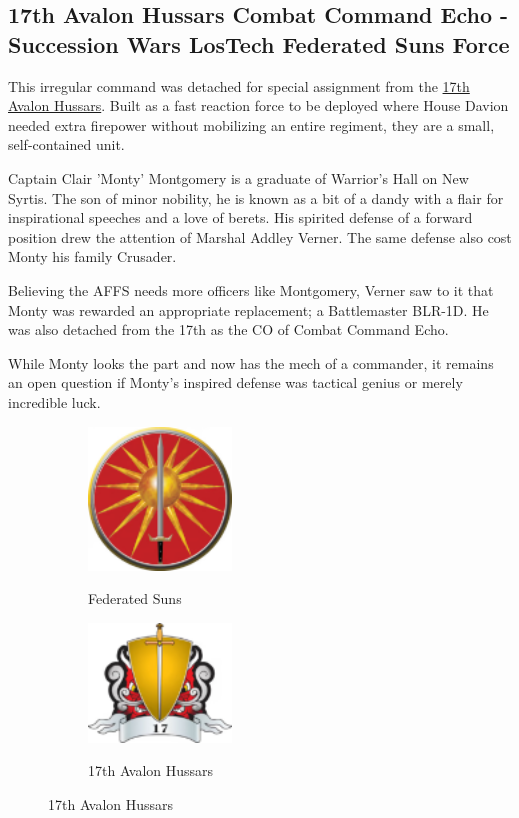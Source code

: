 \subsection{17th Avalon Hussars Combat Command Echo - Succession Wars LosTech Federated Suns Force}

This irregular command was detached for special assignment from the \href{https://www.sarna.net/wiki/17th_Avalon_Hussars}{17th Avalon Hussars}.
Built as a fast reaction force to be deployed where House Davion needed extra firepower without mobilizing an entire regiment, they are a small, self-contained unit.

Captain Clair 'Monty' Montgomery is a graduate of Warrior's Hall on New Syrtis.
The son of minor nobility, he is known as a bit of a dandy with a flair for inspirational speeches and a love of berets.
His spirited defense of a forward position drew the attention of Marshal Addley Verner.
The same defense also cost Monty his family Crusader.

Believing the AFFS needs more officers like Montgomery, Verner saw to it that Monty was rewarded an appropriate replacement; a Battlemaster BLR-1D.
He was also detached from the 17th as the CO of Combat Command Echo. 
 
While Monty looks the part and now has the mech of a commander, it remains an open question if Monty’s inspired defense was tactical genius or merely incredible luck.

\begin{figure}[!h]
  \begin{center}
  \begin{subfigure}{0.4\textwidth}
  \centering
  \includegraphics[alt='Federated Suns Logo', width=1.5in, height=1.5in]{img/Federated-Suns.png}
  \caption*{Federated Suns}
  \end{subfigure}
  \hspace{1in}
  \begin{subfigure}{0.4\textwidth}
  \centering
  \includegraphics[alt='17th Avalon Hussars Logo', width=1.5in, height=1.25in]{img/17-Avalon-Hussars.png}
  \caption*{17th Avalon Hussars}
  \end{subfigure}
  \end{center}
\end{figure}


